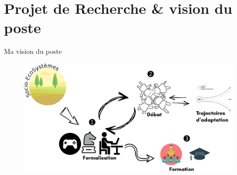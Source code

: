 \documentclass[newPxFont]{beamer}
\begin{document}
\section{Projet de Recherche \& vision du poste}


\begin{frame}{Ma vision du poste}
	\vspace{-2em}

  \begin{figure}
    \includegraphics[width=\textwidth]{img/profil_poste}
  \end{figure}
\end{frame}

\end{document}
